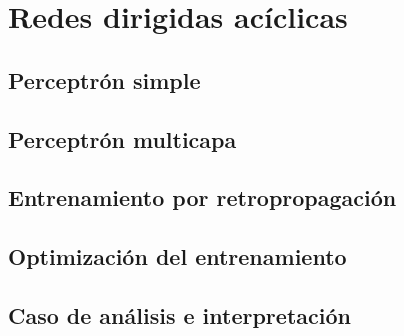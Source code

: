 \documentclass[12pt,openany]{book}
\begin{document}
\part{Redes dirigidas acíclicas}
\chapter{Perceptrón simple}






\chapter{Perceptrón multicapa}




\chapter{Entrenamiento por retropropagación}








\chapter{Optimización del entrenamiento} 






\chapter{Caso de análisis e interpretación}


\end{document}
